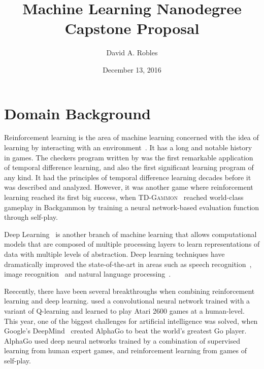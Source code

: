 \documentclass{article}
\title{Machine Learning Nanodegree \\ Capstone Proposal}
\author{David A. Robles}
\date{December 13, 2016}
\begin{document}
\maketitle

\section{Domain Background}

Reinforcement learning is the area of machine learning concerned with the idea of learning by
interacting with an environment~\citep{Sutton1998RL}. It has a long and notable history in games.
The checkers program written by \citet{Samuel1959Checkers} was the first remarkable application of
temporal difference learning, and also the first significant learning program of any kind. It had
the principles of temporal difference learning decades before it was described and analyzed.
However, it was another game where reinforcement learning reached its first big success, when
\textsc{TD-Gammon}~\citep{Tesauro1995TD} reached world-class gameplay in Backgammon by training a
neural network-based evaluation function through self-play.

Deep Learning~\citep{LeCun2015Nature} is another branch of machine learning that allows
computational models that are composed of multiple processing layers to learn representations of
data with multiple levels of abstraction.  Deep learning techniques have dramatically improved the
state-of-the-art in areas such as speech recognition~\citep{Hinton2012Speech}, image
recognition~\citep{Krizhevsky2012ImageNet} and natural language processing~\citep{Colbert2012}.

Reecently, there have been several breakthroughs when combining reinforcement learning and deep
learning. \cite{Mnih2015AtariNature} used a convolutional neural network trained with a variant of
Q-learning and learned to play Atari 2600 games at a human-level. This year, one of the biggest
challenges for artificial intelligence was solved, when Google's DeepMind~\citep{Silver2016GoNature}
created AlphaGo to beat the world's greatest Go player. AlphaGo used deep neural networks trained by
a combination of supervised learning from human expert games, and reinforcement learning from games
of self-play.
\end{document}
